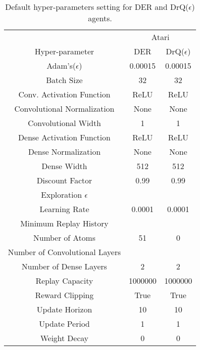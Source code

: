 \begin{table}[!h]
 \centering
  \caption{Default hyper-parameters setting for DER and DrQ($\epsilon$) agents.}
  \label{tbl:defaultvalues}
 \begin{tabular}{@{} ccc @{}}
    \toprule
    & \multicolumn{2}{c}{Atari}\\
    \cmidrule(lr){2-3}
  Hyper-parameter &  DER & DrQ($\epsilon$) \\
    \midrule
     Adam's($\epsilon$) & 0.00015 & 0.00015\\
     Batch Size & 32 & 32\\
     Conv. Activation Function & ReLU & ReLU \\
     Convolutional Normalization & None & None \\
     Convolutional Width & 1& 1\\
     Dense Activation Function & ReLU & ReLU\\
     Dense Normalization & None & None \\
     Dense Width & 512 & 512 \\
     Discount Factor & 0.99 & 0.99 \\
     Exploration $\epsilon$ & & \\
     Learning Rate & 0.0001 & 0.0001 \\
     Minimum Replay History & & \\
     Number of Atoms & 51 & 0 \\
     Number of Convolutional Layers & & \\
     Number of Dense Layers & 2 & 2\\
     Replay Capacity & 1000000 & 1000000 \\
     Reward Clipping & True & True \\
     Update Horizon & 10 & 10 \\
     Update Period & 1& 1\\
    Weight Decay & 0 & 0\\
     \bottomrule
  \end{tabular}
\end{table}


